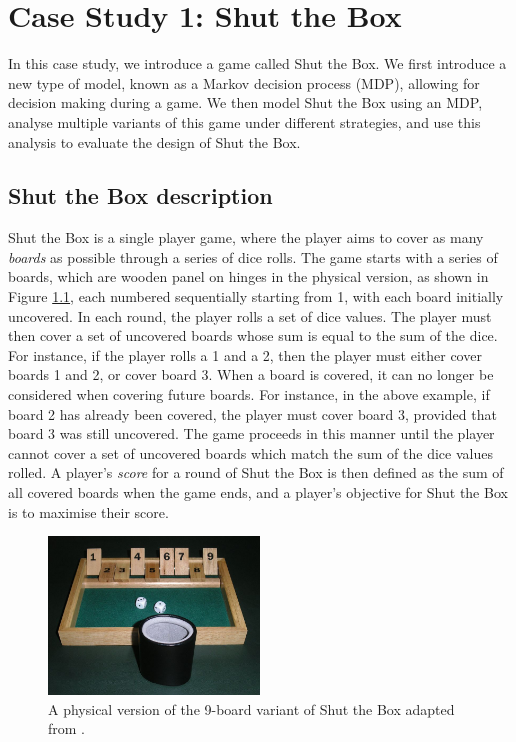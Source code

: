 \chapter{Case Study 1: Shut the Box}
\label{cs1}

In this case study, we introduce a game called Shut the Box. We first introduce a new type of model, known as a Markov decision process (MDP), allowing for decision making during a game. We then model Shut the Box using an MDP, analyse multiple variants of this game under different strategies, and use this analysis to evaluate the design of Shut the Box.

\section{Shut the Box description}
\label{cs1:stb_description}

Shut the Box is a single player game, where the player aims to cover as many \emph{boards} as possible through a series of dice rolls. The game starts with a series of boards, which are wooden panel on hinges in the physical version, as shown in Figure \ref{cs1:physical_stb}, each numbered sequentially starting from 1, with each board initially uncovered. In each round, the player rolls a set of dice values. The player must then cover a set of uncovered boards whose sum is equal to the sum of the dice. For instance, if the player rolls a 1 and a 2, then the player must either cover boards 1 and 2, or cover board 3. When a board is covered, it can no longer be considered when covering future boards. For instance, in the above example, if board 2 has already been covered, the player must cover  board 3, provided that board 3 was still uncovered. The game proceeds in this manner until the player cannot cover a set of uncovered boards which match the sum of the dice values rolled. A player's \emph{score} for a round of Shut the Box is then defined as the sum of all covered boards when the game ends, and a player's objective for Shut the Box is to maximise their score.

\begin{figure}[h]
    \centering
    \includegraphics[width=0.5\textwidth]{images/shut_the_box.jpg}
    \caption{A physical version of the 9-board variant of Shut the Box adapted from \cite{wikipedia_deutsch_2006}.}
    \label{cs1:physical_stb}
\end{figure}

